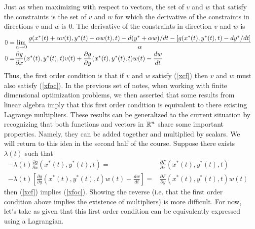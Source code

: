 Just as when maximizing with respect to vectors, the set of $v$ and
$w$ that satisfy the constraints is the set of $v$ and $w$ for which the
derivative of the constraints in directions $v$ and $w$ is 0. The
derivative of the constraints in direction $v$ and $w$ is
\begin{align} 
  0 = & \lim_{\alpha \to 0} \frac{g(x^*(t) + \alpha v(t), y^*(t) +
        \alpha w(t),t) -
        d(y^*+\alpha w)/dt - [g(x^*(t), y^*(t),t) - dy^*/dt]}{\alpha} \notag \\
  0 = & \frac{\partial g}{\partial x}(x^*(t),y^*(t),t)v(t) +
        \frac{\partial g}{\partial y}(x^*(t),y^*(t),t)w(t) - \frac{dw}{dt}\label{xcf}
\end{align}
Thus, the first order condition is that if $v$ and $w$ satisfy
(\ref{xcf}) then $v$ and $w$ must also satisfy (\ref{xfoc}). In the
previous set of notes, when working with finite dimensional
optimization problems, we then asserted that some results from linear
algebra imply that this first order condition is equivalent to there
existing Lagrange multipliers. These results can be generalized to the
current situation by recognizing that both functions and vectors in
$\R^n$ share some important properties. Namely, they can be added
together and multiplied by scalars. We will return to this idea in the
second half of the course. Suppose there exists $\lambda(t)$ such that
\begin{align*}
  -\lambda(t)  \frac{\partial g}{\partial x}(x^*(t),y^*(t),t) = &
  \frac{\partial F}{\partial x}(x^*(t),y^*(t),t) \\
  -\lambda(t)  \left[ \frac{\partial g}{\partial y}(x^*(t),y^*(t),t)w(t)
  - \frac{dw}{dt} \right]= &
                             \frac{\partial F}{\partial
                             y}(x^*(t),y^*(t),t)w(t) 
\end{align*}
then (\ref{xcf}) implies (\ref{xfoc}). Showing the reverse (i.e. that
the first order condition above implies the existence of multipliers)
is more difficult. For now, let's take as given that this first order
condition can be equivalently expressed using a Lagrangian.

